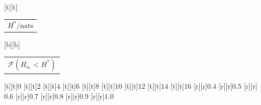 %    
%
%
\begin{psfrags}%
\psfragscanon%
%
[t][t]{\color[rgb]{0,0,0}\setlength{\tabcolsep}{0pt}\begin{tabular}{c}{\Large$H^\ast/\mathrm{nats}$}\end{tabular}}%
[b][b]{\color[rgb]{0,0,0}\setlength{\tabcolsep}{0pt}\begin{tabular}{c}{\Large$\mathcal{F}(H_{a_\ast} < H^\ast)$}\end{tabular}}%
%
[t][t]{$0$}%
[t][t]{$2$}%
[t][t]{$4$}%
[t][t]{$6$}%
[t][t]{$8$}%
[t][t]{$10$}%
[t][t]{$12$}%
[t][t]{$14$}%
[t][t]{$16$}%
%
[r][r]{$0.4$}%
[r][r]{$0.5$}%
[r][r]{$0.6$}%
[r][r]{$0.7$}%
[r][r]{$0.8$}%
[r][r]{$0.9$}%
[r][r]{$1.0$}%
%
%
\end{psfrags}%
%
